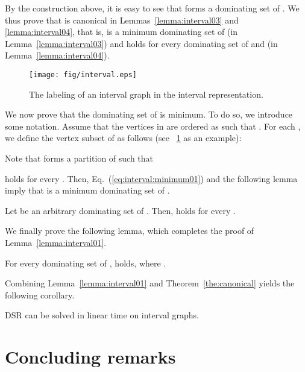\documentclass{llncs}
\begin{document}
By the construction above, it is easy to see that  forms a dominating set of .
We thus prove that  is canonical in Lemmas~\ref{lemma:interval03}
and \ref{lemma:interval04}, that is,  is a minimum dominating
set of  (in Lemma~\ref{lemma:interval03}) and  holds for
every dominating set  of  and  (in Lemma~\ref{lemma:interval04}).

\begin{figure}[t]
	\centering
		\texttt{[image: fig/interval.eps]}
		\vspace{-1em}
		\caption{The labeling of an interval graph in the interval representation.}
		\vspace{-1em}
	\label{fig:interval}
\end{figure}





We now prove that the dominating set  of  is minimum.
To do so, we introduce some notation.
Assume that the vertices in  are ordered as  such
that .
For each , we define the vertex subset
 of  as follows (see \figurename~\ref{fig:interval} as an example):
	


\noindent
Note that  forms a partition of  such that

holds for every .
Then, Eq.~(\ref{eq:interval:minimum01}) and the following lemma imply that  is a minimum dominating set of .
	
\begin{lemma}[*]\label{lemma:interval03}
Let  be an arbitrary dominating set of .
Then,  holds for every .
\end{lemma}

We finally prove the following lemma, which completes the proof of Lemma~\ref{lemma:interval01}.

\begin{lemma}[*]\label{lemma:interval04}
For every dominating set  of ,  holds, where .
\end{lemma}

Combining Lemma~\ref{lemma:interval01} and Theorem~\ref{the:canonical} yields the following corollary.
\begin{corollary} \label{cor:interval}
{\sc DSR} can be solved in linear time on interval graphs.
\end{corollary}


\section{Concluding remarks} \label{dsr:conclusion}
\end{document}
